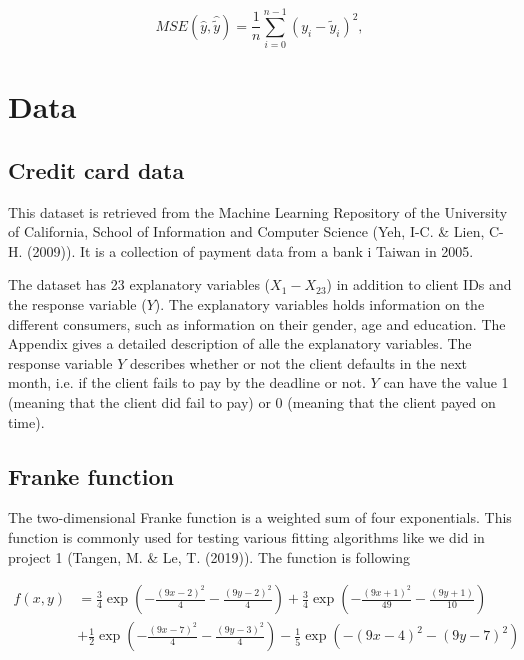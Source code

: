 \documentclass[11pt,english, A4]{article}
\begin{document}
\[ MSE(\hat{y},\hat{\tilde{y}}) = \frac{1}{n}
\sum_{i=0}^{n-1}(y_i-\tilde{y}_i)^2, 
\] 



\section{Data}

\subsection{Credit card data}
This dataset is retrieved from the Machine Learning Repository of the University of California, School of Information and Computer Science (Yeh, I-C. \& Lien, C-H. (2009)). It is a collection of payment data from a bank i Taiwan in 2005.


The dataset has 23 explanatory variables ($X_{1} - X_{23}$) in addition to client IDs and the response variable ($Y$). The explanatory variables holds information on the different consumers, such as information on their gender, age and education. The Appendix gives a detailed description of alle the explanatory variables. The response variable $Y$ describes whether or not the client defaults in the next month, i.e. if the client fails to pay by the deadline or not. $Y$ can have the value 1 (meaning that the client did fail to pay) or 0 (meaning that the client payed on time).

\subsection{Franke function}
The two-dimensional Franke function is a weighted sum of four exponentials. This function is commonly used for testing various fitting algorithms like we did in project 1 (Tangen, M. \& Le, T. (2019)). The function is following

\begin{align}
f(x,y) &= \frac{3}{4}\exp{\left(-\frac{(9x-2)^2}{4} - \frac{(9y-2)^2}{4}\right)}+\frac{3}{4}\exp{\left(-\frac{(9x+1)^2}{49}- \frac{(9y+1)}{10}\right)} \nonumber \\
&+\frac{1}{2}\exp{\left(-\frac{(9x-7)^2}{4} - \frac{(9y-3)^2}{4}\right)} -\frac{1}{5}\exp{\left(-(9x-4)^2 - (9y-7)^2\right) } \label{eq:Franke}
\end{align}


\end{document}
